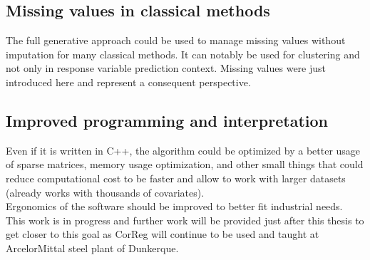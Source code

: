 \documentclass[12pt,a4paper]{report}
\begin{document}
			\subsection{Missing values in classical methods}
			The full generative approach could be used to manage missing values without imputation for many classical methods.
			It can notably be used for clustering and not only in response variable prediction context.
			Missing values were just introduced here and represent a consequent perspective.
		\subsection{Improved programming and interpretation}
			Even if it is written in C++, the algorithm could be optimized by a better usage of sparse matrices, memory usage optimization, and other small things that could reduce computational cost to be faster and allow to work with larger datasets (already works with thousands of covariates).\\
			Ergonomics of the software should be improved to better fit industrial needs. This work is in progress and further work will be provided just after this thesis to get closer to this goal as {\sc CorReg} will continue to be used and taught at ArcelorMittal steel plant of Dunkerque.
			
		
\cleardoublepage


%

%		
%		
%		
%		
%		
%			
\end{document}
